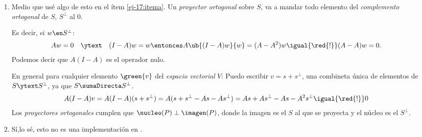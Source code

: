 \begin{enumerate}[label=(\alph*)]
  \item Medio que usé algo de esto en el ítem \ref{ej-17:itema}. Un \textit{proyector ortogonal} sobre $S$, va
        a mandar todo elemento del \textit{complemento ortogonal} de $S,\, S^\perp$ al 0.

        Es decir, si $w \en S^\perp$:
        $$
          A w = 0
          \quad \ytext \quad
          (I - A)w = w
          \entonces
          A \ub{(I - A)w}{w} =
          (A - A^2)w
          \igual{\red{!}}
          (A - A )w = 0.
        $$
        Podemos decir que $A(I - A)$ es el operador nulo.
        
        En general para cualquier elemento $\green{v}$ del \textit{espacio vectorial} $V$: Puedo escribir $v = s + s^\perp$,
        una combineta única de elementos de $S \ytext S^\perp$, ya que $S \sumaDirecta S^\perp$.
        $$
          A(I - A) v = A(I - A)(s + s^\perp) = A(s + s^\perp - As - As^\perp) = As + As^\perp - As - A^2s^\perp \igual{\red{!}} 0
        $$
        Los \textit{proyectores ortogonales} cumplen que $\nucleo(P) \perp \imagen(P)$, donde la imagen es el $S$ al que se proyecta y
        el núcleo es el $S^\perp$.

  \item Sí,lo sé, esto no es una implementación en \python.


\end{enumerate}

\begin{aportes}
  \item {}
\end{aportes}
